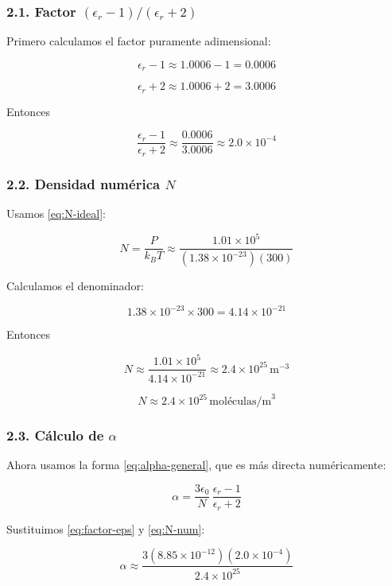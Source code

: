 \documentclass{article}
\begin{document}
\subsubsection*{2.1. Factor \((\epsilon_{r}-1)/(\epsilon_{r}+2)\)}

Primero calculamos el factor puramente adimensional:

\[
\epsilon_{r} - 1 \approx 1.0006 - 1 = 0.0006
\]

\[
\epsilon_{r} + 2 \approx 1.0006 + 2 = 3.0006
\]

Entonces

\begin{equation}
\frac{\epsilon_{r}-1}{\epsilon_{r}+2}
\approx \frac{0.0006}{3.0006}
\approx 2.0\times 10^{-4}
\label{eq:factor-eps}
\end{equation}

\subsubsection*{2.2. Densidad numérica $N$}

Usamos \eqref{eq:N-ideal}:

\[
N = \frac{P}{k_{B}T}
\approx \frac{1.01\times 10^{5}}
             {(1.38\times 10^{-23})(300)}
\]

Calculamos el denominador:

\[
1.38\times 10^{-23}\times 300
= 4.14\times 10^{-21}
\]

Entonces

\[
N \approx \frac{1.01\times 10^{5}}{4.14\times 10^{-21}}
\approx 2.4\times 10^{25}\,\text{m}^{-3}
\]

\begin{equation}
N \approx 2.4\times 10^{25}\,\text{moléculas/m}^{3}
\label{eq:N-num}
\end{equation}

\subsubsection*{2.3. Cálculo de $\alpha$}

Ahora usamos la forma \eqref{eq:alpha-general}, que es más directa numéricamente:

\[
\alpha = \frac{3\epsilon_{0}}{N}\,
         \frac{\epsilon_{r}-1}{\epsilon_{r}+2}
\]

Sustituimos \eqref{eq:factor-eps} y \eqref{eq:N-num}:

\[
\alpha \approx
\frac{3(8.85\times 10^{-12})(2.0\times 10^{-4})}
     {2.4\times 10^{25}}
\]
\end{document}
